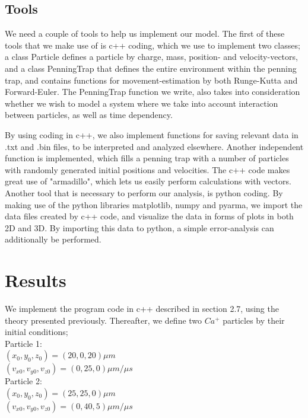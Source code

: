 \documentclass[english,notitlepage,reprint,nofootinbib,twocolumn]{article}
\begin{document}
\subsection{Tools}
We need a couple of tools to help us implement our model. The first of these tools that we make use of is c++ coding, which we use to implement two classes; a class Particle defines a particle by charge, mass, position- and velocity-vectors, and a class PenningTrap that defines the entire environment within the penning trap, and contains functions for movement-estimation by both Runge-Kutta and Forward-Euler. The PenningTrap function we write, also takes into consideration whether we wish to model a system where we take into account interaction between particles, as well as time dependency. 

By using coding in c++, we also implement functions for saving relevant data in .txt and .bin files, to be interpreted and analyzed elsewhere. Another independent function is implemented, which fills a penning trap with a number of particles with randomly generated initial positions and velocities. The c++ code makes great use of "armadillo", which lets us easily perform calculations with vectors. \\

Another tool that is necessary to perform our analysis, is python coding. By making use of the python libraries matplotlib, numpy and pyarma, we import the data files created by c++ code, and visualize the data in forms of plots in both 2D and 3D. By importing this data to python, a simple error-analysis can additionally be performed. 


\section{Results}\label{sec:results}
We implement the program code in c++ described in section 2.7, using the theory presented previously. Thereafter, we define two $Ca^+$ particles by their initial conditions; \\

Particle 1:\\
$(x_0, y_0, z_0) = (20, 0, 20)\mu m $ \\
$(v_{x0}, v_{y0}, v_{z0}) = (0, 25, 0)\mu m / \mu s$\\

Particle 2: \\
$(x_0, y_0, z_0) = (25, 25, 0)\mu m $\\
$(v_{x0}, v_{y0}, v_{z0}) = (0, 40, 5)\mu m / \mu s$ 
\end{document}
